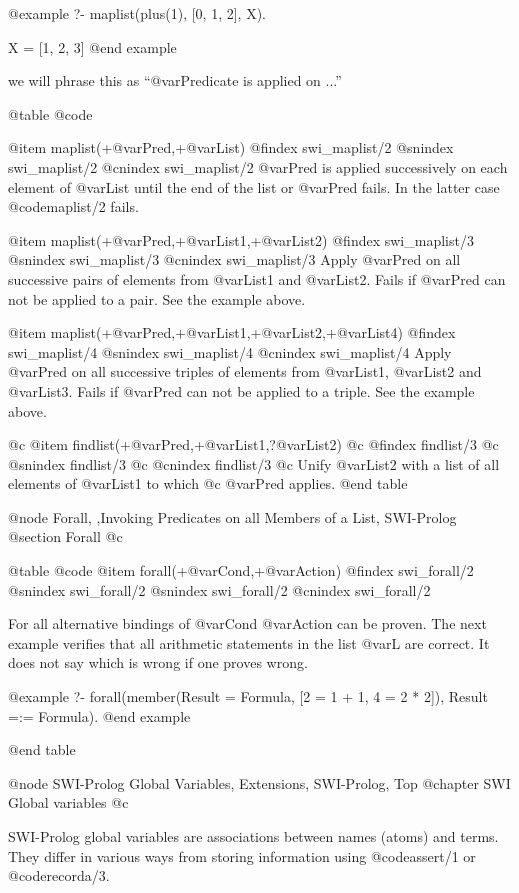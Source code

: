 @example
?- maplist(plus(1), [0, 1, 2], X).

X = [1, 2, 3]
@end example

we will phrase this as ``@var{Predicate} is applied on ...''

@table @code

@item maplist(+@var{Pred},+@var{List})
@findex swi_maplist/2
@snindex swi_maplist/2
@cnindex swi_maplist/2
@var{Pred} is applied successively on each element of @var{List} until
the end of the list or @var{Pred} fails. In the latter case 
@code{maplist/2} fails.

@item maplist(+@var{Pred},+@var{List1},+@var{List2})
@findex swi_maplist/3
@snindex swi_maplist/3
@cnindex swi_maplist/3
Apply @var{Pred} on all successive pairs of elements from
@var{List1} and
@var{List2}. Fails if @var{Pred} can not be applied to a
pair. See the example above.

@item maplist(+@var{Pred},+@var{List1},+@var{List2},+@var{List4})
@findex swi_maplist/4
@snindex swi_maplist/4
@cnindex swi_maplist/4
Apply @var{Pred} on all successive triples of elements from @var{List1},
@var{List2} and @var{List3}. Fails if @var{Pred} can not be applied to a
triple. See the example above.

@c @item findlist(+@var{Pred},+@var{List1},?@var{List2})
@c @findex findlist/3
@c @snindex findlist/3
@c @cnindex findlist/3
@c Unify @var{List2} with a list of all elements of @var{List1} to which
@c @var{Pred} applies.
@end table

@node Forall, ,Invoking Predicates on all Members of a List, SWI-Prolog
@section Forall			
@c \label{sec:forall2}

@table @code
@item forall(+@var{Cond},+@var{Action})
@findex swi_forall/2
@snindex swi_forall/2
@snindex swi_forall/2
@cnindex swi_forall/2

For all alternative bindings of @var{Cond} @var{Action} can be proven.
The next example verifies that all arithmetic statements in the list
@var{L} are correct. It does not say which is wrong if one proves wrong.

@example
?- forall(member(Result = Formula, [2 = 1 + 1, 4 = 2 * 2]),
                 Result =:= Formula).
@end example

@end table

@node SWI-Prolog Global Variables,  Extensions, SWI-Prolog, Top
@chapter SWI Global variables
@c		\label{sec:gvar}

SWI-Prolog global variables are associations between names (atoms) and
terms.  They differ in various ways from storing information using
@code{assert/1} or @code{recorda/3}.

